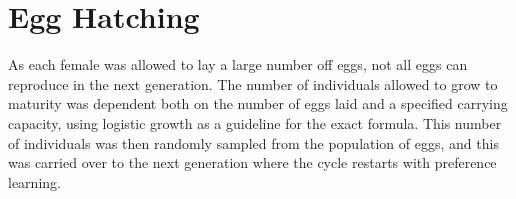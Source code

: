 \documentclass{article}
\begin{document}
\section{Egg Hatching}
As each female was allowed to lay a large number off eggs, not all eggs can reproduce in the next generation. The number of individuals allowed to grow to maturity was dependent both on the number of eggs laid and a specified carrying capacity, using logistic growth as a guideline for the exact formula. This number of individuals was then randomly sampled from the population of eggs, and this was carried over to the next generation where the cycle restarts with preference learning.

\printbibliography
\end{document}
